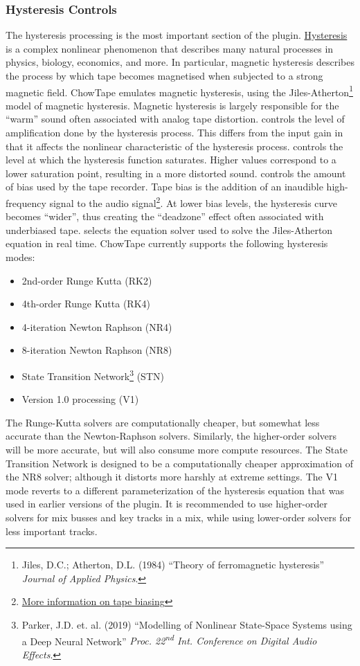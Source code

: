 \documentclass[landscape,twocolumn,a5paper]{manual}
\begin{document}
\subsubsection{Hysteresis Controls}
The hysteresis processing is the most important section of the
plugin. \href{https://en.wikipedia.org/wiki/Hysteresis}{Hysteresis}
is a complex nonlinear phenomenon that describes many
natural processes in physics, biology, economics, and more.
In particular, magnetic hysteresis describes the process by
which tape becomes magnetised when subjected to a strong magnetic
field. ChowTape emulates magnetic hysteresis, using the
Jiles-Atherton\footnote{Jiles, D.C.; Atherton, D.L. (1984) ``Theory of ferromagnetic hysteresis'' \textit{Journal of Applied Physics}.}
model of magnetic hysteresis. Magnetic hysteresis is largely
responsible for the ``warm'' sound often associated with
analog tape distortion.
\newpar
{} controls the level of amplification done by
the hysteresis process. This differs from the input gain in that
it affects the nonlinear characteristic of the hysteresis process.
\newpar
{} controls the level at which the hysteresis
function saturates. Higher values correspond to a lower saturation
point, resulting in a more distorted sound.
\newpar
{} controls the amount of bias used by the tape
recorder. Tape bias is the addition of an inaudible high-frequency
signal to the audio signal\footnote{\href{https://hccc.org.uk/acbias.html}{More information on tape biasing}}.
At lower bias levels, the hysteresis curve becomes ``wider'',
thus creating the ``deadzone'' effect often associated with
underbiased tape.
\newpar
{} selects the equation solver used
to solve the Jiles-Atherton equation in real time. ChowTape
currently supports the following hysteresis modes:
\renewcommand{\labelitemi}{\textendash}
\begin{itemize}
    \itemsep-1mm
    \item 2nd-order Runge Kutta (RK2)
    \item 4th-order Runge Kutta (RK4)
    \item 4-iteration Newton Raphson (NR4)
    \item 8-iteration Newton Raphson (NR8)
    \item State Transition Network\footnote{Parker, J.D. et. al. (2019) ``Modelling of Nonlinear State-Space Systems using a Deep Neural Network'' \textit{Proc. 22\textsuperscript{nd} Int. Conference on Digital Audio Effects}.} (STN)
    \item Version 1.0 processing (V1)
\end{itemize}
%
The Runge-Kutta solvers are computationally cheaper, but
somewhat less accurate than the Newton-Raphson solvers.
Similarly, the higher-order solvers will be more accurate,
but will also consume more compute resources. The State
Transition Network is designed to be a computationally
cheaper approximation of the NR8 solver; although it
distorts more harshly at extreme settings. The V1 mode
reverts to a different parameterization of the hysteresis
equation that was used in earlier versions of the plugin. It
is recommended to use higher-order solvers for mix busses
and key tracks in a mix, while using lower-order solvers for
less important tracks.
\end{document}
